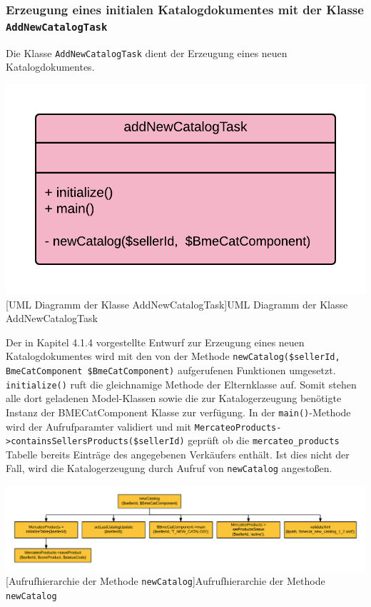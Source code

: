 	
	
	\subsubsection{Erzeugung eines initialen Katalogdokumentes mit der Klasse \texttt{AddNewCatalogTask}}
	
	Die Klasse \texttt{AddNewCatalogTask} dient der Erzeugung eines neuen Katalogdokumentes. \\
	\begin{minipage}{\linewidth}
			\vspace{1em}
			\centering
			\includegraphics[width=0.5 \linewidth]{img/AddNewCatalogTaskUML}
			[UML Diagramm der Klasse AddNewCatalogTask]{UML Diagramm der Klasse AddNewCatalogTask}
			\vspace{1em}
	\end{minipage}
	Der in Kapitel 4.1.4 vorgestellte Entwurf zur Erzeugung eines neuen Katalogdokumentes wird mit den von der Methode \texttt{newCatalog(\$sellerId, BmeCatComponent \$BmeCatComponent)} aufgerufenen Funktionen umgesetzt.
	\texttt{initialize()} ruft die gleichnamige Methode der Elternklasse auf. Somit stehen alle dort geladenen Model-Klassen sowie die zur Katalogerzeugung benötigte Instanz der BMECatComponent Klasse zur verfügung.
	In der \texttt{main()}-Methode wird der Aufrufparamter validiert und mit \texttt{MercateoProducts->containsSellersProducts(\$sellerId)} geprüft ob die \texttt{mercateo\_products} Tabelle bereits Einträge des angegebenen Verkäufers enthält. Ist dies nicht der Fall, wird die Katalogerzeugung durch Aufruf von \texttt{newCatalog} angestoßen.
	
	 
	\begin{minipage}{\linewidth}
		\vspace{1em}
		\centering
		\includegraphics[width=1 \linewidth]{img/newCatalogAufrufhierarchie}
		[Aufrufhierarchie der Methode \texttt{newCatalog}]{Aufrufhierarchie der Methode \texttt{newCatalog}}
		\vspace{1em}
	\end{minipage}

